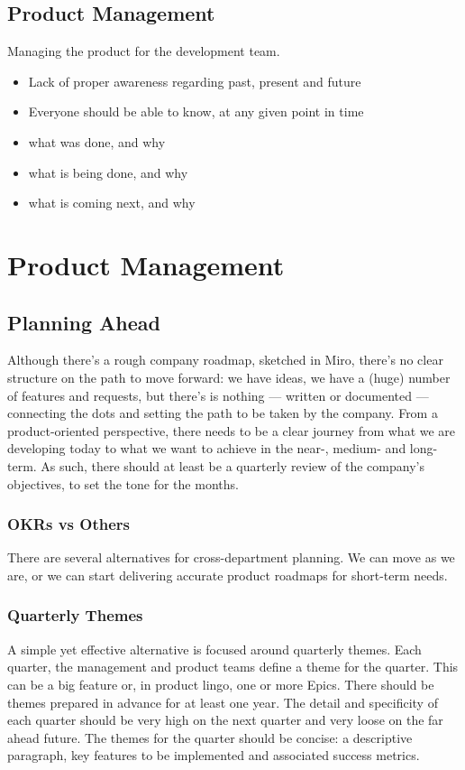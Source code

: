\documentclass[11pt,a4paper,parskip=half]{scrartcl}
\begin{document}
\subsection{Product Management}

Managing the product for the development team.
\begin{itemize}
\item Lack of proper awareness regarding past, present and future
\item Everyone should be able to know, at any given point in time
\item what was done, and why
\item what is being done, and why
\item what is coming next, and why
\end{itemize}

\section{Product Management}
\subsection{Planning Ahead}
Although there’s a rough company roadmap, sketched in Miro, there’s no clear structure on the path to move forward: we have ideas, we have a (huge) number of features and requests, but there’s is nothing — written or documented — connecting the dots and setting the path to be taken by the company. 
From a product-oriented perspective, there needs to be a clear journey from what we are developing today to what we want to achieve in the near-, medium- and long-term. As such, there should at least be a quarterly review of the company’s objectives, to set the tone for the months. 
\subsubsection{OKRs vs Others}
There are several alternatives for cross-department planning. We can move as we are, or we can start delivering accurate product roadmaps for short-term needs. 

\subsubsection{Quarterly Themes}

A simple yet effective alternative is focused around quarterly themes. Each quarter, the management and product teams define a theme for the quarter. This can be a big feature or, in product lingo, one or more Epics. There should be themes prepared in advance for at least one year. The detail and specificity of each quarter should be very high on the next quarter and very loose on the far ahead future. 
The themes for the quarter should be concise: a descriptive paragraph, key features to be implemented and associated success metrics.
\end{document}
